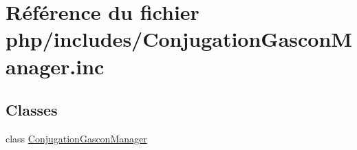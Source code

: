 \hypertarget{_conjugation_gascon_manager_8inc}{}\section{Référence du fichier php/includes/\+Conjugation\+Gascon\+Manager.inc}
\label{_conjugation_gascon_manager_8inc}
\subsection*{Classes}
\begin{DoxyCompactItemize}
\item 
class \hyperlink{class_conjugation_gascon_manager}{Conjugation\+Gascon\+Manager}
\end{DoxyCompactItemize}
